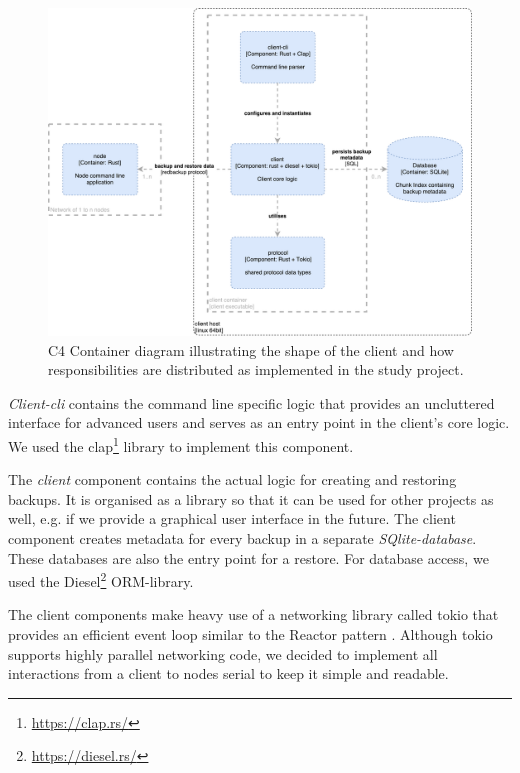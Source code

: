 \begin{figure}[h]
	\centering
	\includegraphics[width=1\linewidth]{resources/c4-client-container}
	\caption[Client specific C4 Container diagram]{C4 Container diagram illustrating the shape of the \gls{client} and how responsibilities are distributed as implemented in the study project.}
	\label{fig:c4-client-container}
\end{figure}

\emph{Client-cli} contains the command line specific logic that provides an uncluttered interface for advanced users and serves as an entry point in the client's core logic. We used the clap\footnote{\url{https://clap.rs/}}  library to implement this component.

The \emph{client} component contains the actual logic for creating and restoring backups. It is organised as a library so that it can be used for other projects as well, e.g. if we provide a graphical user interface in the future. The \gls{client} component creates metadata for every backup in a separate \emph{SQlite-database}. These databases are also the entry point for a restore. For database access, we used the Diesel\footnote{\url{https://diesel.rs/}} ORM-library.

The \gls{client} components make heavy use of a networking library called tokio\cite{tokio-rs} that provides an efficient event loop similar to the Reactor pattern \cite{POSA1}. Although tokio supports highly parallel networking code, we decided to implement all interactions from a \gls{client} to \glspl{node} serial to keep it simple and readable.

